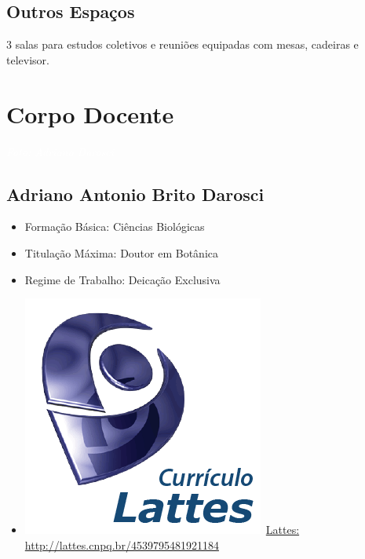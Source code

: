 \documentclass[11pt,fleqn]{book} %
\begin{document}
\section{Outros Espaços}

3 salas para estudos coletivos e reuniões equipadas com mesas, cadeiras e televisor.


\chapter{Corpo Docente}
\vspace{6em}
\begin{flushright}
	\textit{\textcolor{white}{Foto: Adriano Darosci}}
\end{flushright}
\vspace{12em}

\section{Adriano Antonio Brito Darosci}\label{AdrianoDarosci}
\begin{itemize}
	\item Formação Básica: Ciências Biológicas
	\item Titulação Máxima: Doutor em Botânica
	\item Regime de Trabalho: Deicação Exclusiva
	\item \includegraphics[scale=.03]{Pictures/lattes}~\href{http://lattes.cnpq.br/4539795481921184}{Lattes: http://lattes.cnpq.br/4539795481921184}
\end{itemize}
\end{document}
